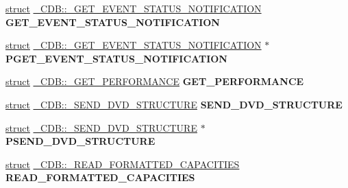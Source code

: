 \begin{DoxyCompactItemize}
\item 
\mbox{\label{union___c_d_b_a76c2ce4129ce575d8296839c600b477b}} 
\hyperlink{interfacestruct}{struct} \hyperlink{struct___c_d_b_1_1___g_e_t___e_v_e_n_t___s_t_a_t_u_s___n_o_t_i_f_i_c_a_t_i_o_n}{\+\_\+\+C\+D\+B\+::\+\_\+\+G\+E\+T\+\_\+\+E\+V\+E\+N\+T\+\_\+\+S\+T\+A\+T\+U\+S\+\_\+\+N\+O\+T\+I\+F\+I\+C\+A\+T\+I\+ON} {\bfseries G\+E\+T\+\_\+\+E\+V\+E\+N\+T\+\_\+\+S\+T\+A\+T\+U\+S\+\_\+\+N\+O\+T\+I\+F\+I\+C\+A\+T\+I\+ON}
\item 
\mbox{\label{union___c_d_b_a8cdf9ab1e7fe6bd77630e15d333724f6}} 
\hyperlink{interfacestruct}{struct} \hyperlink{struct___c_d_b_1_1___g_e_t___e_v_e_n_t___s_t_a_t_u_s___n_o_t_i_f_i_c_a_t_i_o_n}{\+\_\+\+C\+D\+B\+::\+\_\+\+G\+E\+T\+\_\+\+E\+V\+E\+N\+T\+\_\+\+S\+T\+A\+T\+U\+S\+\_\+\+N\+O\+T\+I\+F\+I\+C\+A\+T\+I\+ON} $\ast$ {\bfseries P\+G\+E\+T\+\_\+\+E\+V\+E\+N\+T\+\_\+\+S\+T\+A\+T\+U\+S\+\_\+\+N\+O\+T\+I\+F\+I\+C\+A\+T\+I\+ON}
\item 
\mbox{\label{union___c_d_b_a3c612d34292dee355156316a68385e21}} 
\hyperlink{interfacestruct}{struct} \hyperlink{struct___c_d_b_1_1___g_e_t___p_e_r_f_o_r_m_a_n_c_e}{\+\_\+\+C\+D\+B\+::\+\_\+\+G\+E\+T\+\_\+\+P\+E\+R\+F\+O\+R\+M\+A\+N\+CE} {\bfseries G\+E\+T\+\_\+\+P\+E\+R\+F\+O\+R\+M\+A\+N\+CE}
\item 
\mbox{\label{union___c_d_b_a983bc7f9012fbb464eba0b937332ed07}} 
\hyperlink{interfacestruct}{struct} \hyperlink{struct___c_d_b_1_1___s_e_n_d___d_v_d___s_t_r_u_c_t_u_r_e}{\+\_\+\+C\+D\+B\+::\+\_\+\+S\+E\+N\+D\+\_\+\+D\+V\+D\+\_\+\+S\+T\+R\+U\+C\+T\+U\+RE} {\bfseries S\+E\+N\+D\+\_\+\+D\+V\+D\+\_\+\+S\+T\+R\+U\+C\+T\+U\+RE}
\item 
\mbox{\label{union___c_d_b_af07e275b55be3f34dc7e9a4f50cdd077}} 
\hyperlink{interfacestruct}{struct} \hyperlink{struct___c_d_b_1_1___s_e_n_d___d_v_d___s_t_r_u_c_t_u_r_e}{\+\_\+\+C\+D\+B\+::\+\_\+\+S\+E\+N\+D\+\_\+\+D\+V\+D\+\_\+\+S\+T\+R\+U\+C\+T\+U\+RE} $\ast$ {\bfseries P\+S\+E\+N\+D\+\_\+\+D\+V\+D\+\_\+\+S\+T\+R\+U\+C\+T\+U\+RE}
\item 
\mbox{\label{union___c_d_b_a11cf5af94c946af96b855334f55df9e5}} 
\hyperlink{interfacestruct}{struct} \hyperlink{struct___c_d_b_1_1___r_e_a_d___f_o_r_m_a_t_t_e_d___c_a_p_a_c_i_t_i_e_s}{\+\_\+\+C\+D\+B\+::\+\_\+\+R\+E\+A\+D\+\_\+\+F\+O\+R\+M\+A\+T\+T\+E\+D\+\_\+\+C\+A\+P\+A\+C\+I\+T\+I\+ES} {\bfseries R\+E\+A\+D\+\_\+\+F\+O\+R\+M\+A\+T\+T\+E\+D\+\_\+\+C\+A\+P\+A\+C\+I\+T\+I\+ES}

\end{DoxyCompactItemize}
